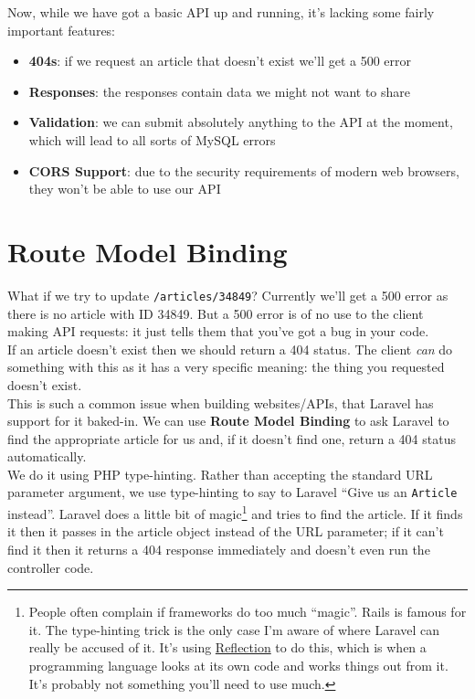 Now, while we have got a basic API up and running, it's lacking some fairly important features:

\begin{itemize}
    \item \textbf{404s}: if we request an article that doesn't exist we'll get a 500 error
    \item \textbf{Responses}: the responses contain data we might not want to share
    \item \textbf{Validation}: we can submit absolutely anything to the API at the moment, which will lead to all sorts of MySQL errors
    \item \textbf{CORS Support}: due to the security requirements of modern web browsers, they won't be able to use our API
\end{itemize}



\section{Route Model Binding}

What if we try to update \texttt{/articles/34849}? Currently we'll get a 500 error as there is no article with ID 34849. But a 500 error is of no use to the client making API requests: it just tells them that you've got a bug in your code.
\\

If an article doesn't exist then we should return a 404 status. The client \textit{can} do something with this as it has a very specific meaning: the thing you requested doesn't exist.
\\

This is such a common issue when building websites/APIs, that Laravel has support for it baked-in. We can use \textbf{Route Model Binding} to ask Laravel to find the appropriate article for us and, if it doesn't find one, return a 404 status automatically.
\\

We do it using PHP type-hinting. Rather than accepting the standard URL parameter argument, we use type-hinting to say to Laravel ``Give us an \texttt{Article} instead''. Laravel does a little bit of magic\footnote{People often complain if frameworks do too much ``magic''. Rails is famous for it. The type-hinting trick is the only case I'm aware of where Laravel can really be accused of it. It's using \href{https://www.culttt.com/2014/07/02/reflection-php}{Reflection} to do this, which is when a programming language looks at its own code and works things out from it. It's probably not something you'll need to use much.} and tries to find the article. If it finds it then it passes in the article object instead of the URL parameter; if it can't find it then it returns a 404 response immediately and doesn't even run the controller code.
\\

